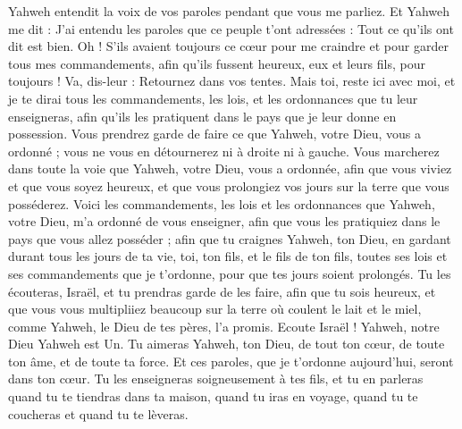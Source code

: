 \begin{multicols}{2}
Yahweh entendit la voix de vos paroles pendant que vous me parliez. Et Yahweh me dit : J'ai entendu les paroles que ce peuple t'ont adressées : Tout ce qu’ils ont dit est bien.
Oh ! S’ils avaient toujours ce cœur pour me craindre et pour garder tous mes commandements, afin qu'ils fussent heureux, eux et leurs fils, pour toujours !
Va, dis-leur : Retournez dans vos tentes.
Mais toi, reste ici avec moi, et je te dirai tous les commandements, les lois, et les ordonnances que tu leur enseigneras, afin qu'ils les pratiquent dans le pays que je leur donne en possession.
Vous prendrez garde de faire ce que Yahweh, votre Dieu, vous a ordonné ; vous ne vous en détournerez ni à droite ni à gauche.
Vous marcherez dans toute la voie que Yahweh, votre Dieu, vous a ordonnée, afin que vous viviez et que vous soyez heureux, et que vous prolongiez vos jours sur la terre que vous posséderez.
\VerseOne{}Voici les commandements, les lois et les ordonnances que Yahweh, votre Dieu, m'a ordonné de vous enseigner, afin que vous les pratiquiez dans le pays que vous allez posséder ;
afin que tu craignes Yahweh, ton Dieu, en gardant durant tous les jours de ta vie, toi, ton fils, et le fils de ton fils, toutes ses lois et ses commandements que je t’ordonne, pour que tes jours soient prolongés.
Tu les écouteras, Israël, et tu prendras garde de les faire, afin que tu sois heureux, et que vous vous multipliiez beaucoup sur la terre où coulent le lait et le miel, comme Yahweh, le Dieu de tes pères, l'a promis.
Ecoute Israël ! Yahweh, notre Dieu Yahweh est Un.
Tu aimeras Yahweh, ton Dieu, de tout ton cœur, de toute ton âme, et de toute ta force.
Et ces paroles, que je t’ordonne aujourd'hui, seront dans ton cœur.
Tu les enseigneras soigneusement à tes fils, et tu en parleras quand tu te tiendras dans ta maison, quand tu iras en voyage, quand tu te coucheras et quand tu te lèveras.

\end{multicols}
